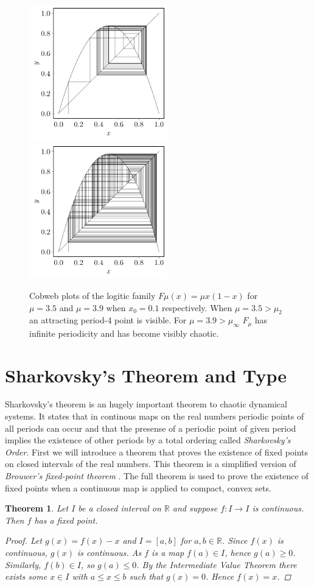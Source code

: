 \documentclass[11pt,a4paper,oneside]{memoir}
\theoremstyle{plain}
\newtheorem{thm}{Theorem}[chapter]
\theoremstyle{definition}
\begin{document}
\begin{figure}[h]
    \centering
    \includegraphics[width=6cm]{cobweb_0.1_3.5.pdf}
    \includegraphics[width=6cm]{cobweb_0.1_3.9.pdf}
    \caption{Cobweb plots of the logitic family $F\mu(x) = \mu x(1-x)$ for $\mu = 3.5$ and $\mu = 3.9$ when $x_0 = 0.1$ respectively. When $\mu = 3.5 > \mu_2$ an attracting period-4 point is visible. For $\mu = 3.9 > \mu_\infty$ $F_\mu$ has infinite periodicity and has become visibly chaotic.}
    \label{fig:cobweb_3.5_3.9}
\end{figure}

\section{Sharkovsky's Theorem and Type}
Sharkovsky's theorem \cite{sharkovsky} is an hugely important theorem to chaotic dynamical systems. It states that in continous maps on the real numbers periodic points of all periods can occur and that the presense of a periodic point of given period implies the existence of other periods by a total ordering called \emph{Sharkovsky's Order}. First we will introduce a theorem that proves the existence of fixed points on closed intervals of the real numbers. This theorem is a simplified version of \emph{Brouwer's fixed-point theorem} \cite{brouwer}. The full theorem is used to prove the existence of fixed points when a continuous map is applied to compact, convex sets.
\begin{thm} \label{thm:fixed-points}
    Let $I$ be a closed interval on $\mathbb{R}$ and suppose $f: I \to I$ is continuous. Then $f$ has a fixed point.
    \begin{proof}
        Let $g(x) = f(x) - x$ and $I = [a, b]$ for $a, b \in \mathbb{R}$. Since $f(x)$ is continuous, $g(x)$ is continuous. As $f$ is a map $f(a) \in I$, hence $g(a) \geq 0$. Similarly, $f(b) \in I$, so $g(a) \leq 0$. By the Intermediate Value Theorem there exists some $x \in I$ with $a \leq x \leq b$ such that $g(x) = 0$. Hence $f(x) = x$.
    \end{proof}
\end{thm}
\end{document}
